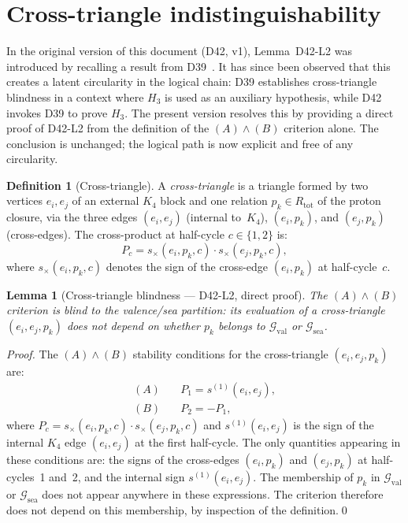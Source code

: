 \documentclass[11pt,a4paper]{article}
\theoremstyle{plain}
\newtheorem{lemma}[theorem]{Lemma}
\theoremstyle{definition}
\newtheorem{definition}[theorem]{Definition}
\theoremstyle{remark}
\newcommand{\Kfour}{K_4}
\newcommand{\Rtot}{R_{\mathrm{tot}}}
\begin{document}
\section{Cross-triangle indistinguishability}
\label{sec:lemma2}

In the original version of this document (D42, v1), Lemma~D42-L2 was introduced by recalling a result from D39~\cite{PDL_D39_2026}. It has since been observed that this creates a latent circularity in the logical chain: D39 establishes cross-triangle blindness in a context where $H_3$ is used as an auxiliary hypothesis, while D42 invokes D39 to prove $H_3$. The present version resolves this by providing a direct proof of D42-L2 from the definition of the $(A)\wedge(B)$ criterion alone. The conclusion is unchanged; the logical path is now explicit and free of any circularity.

\begin{definition}[Cross-triangle]
A \emph{cross-triangle} is a triangle formed by two vertices $e_i, e_j$ of an external $\Kfour$ block and one relation $p_k \in \Rtot$ of the proton closure, via the three edges $(e_i, e_j)$ (internal to~$\Kfour$), $(e_i, p_k)$, and $(e_j, p_k)$ (cross-edges). The cross-product at half-cycle $c \in \{1,2\}$ is:
\[
P_c = s_{\times}(e_i, p_k, c)\cdot s_{\times}(e_j, p_k, c),
\]
where $s_{\times}(e_i, p_k, c)$ denotes the sign of the cross-edge $(e_i, p_k)$ at half-cycle~$c$.
\end{definition}

\begin{lemma}[Cross-triangle blindness --- D42-L2, direct proof]
\label{lem:blind}
The $(A)\wedge(B)$ criterion is blind to the valence/sea partition: its evaluation of a cross-triangle $(e_i, e_j, p_k)$ does not depend on whether $p_k$ belongs to $\mathcal{G}_{\mathrm{val}}$ or $\mathcal{G}_{\mathrm{sea}}$.
\end{lemma}

\begin{proof}
The $(A)\wedge(B)$ stability conditions for the cross-triangle $(e_i, e_j, p_k)$ are:
\begin{align*}
(A) &\quad P_1 = s^{(1)}(e_i, e_j), \\
(B) &\quad P_2 = -P_1,
\end{align*}
where $P_c = s_{\times}(e_i, p_k, c)\cdot s_{\times}(e_j, p_k, c)$ and $s^{(1)}(e_i, e_j)$ is the sign of the internal $\Kfour$ edge $(e_i, e_j)$ at the first half-cycle. The only quantities appearing in these conditions are: the signs of the cross-edges $(e_i, p_k)$ and $(e_j, p_k)$ at half-cycles~1 and~2, and the internal sign $s^{(1)}(e_i, e_j)$. The membership of $p_k$ in $\mathcal{G}_{\mathrm{val}}$ or $\mathcal{G}_{\mathrm{sea}}$ does not appear anywhere in these expressions. The criterion therefore does not depend on this membership, by inspection of the definition.\qed
\end{proof}
\end{document}
